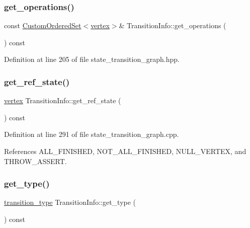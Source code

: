 \subsubsection{\texorpdfstring{get\+\_\+operations()}{get\_operations()}}
{\footnotesize\ttfamily const \hyperlink{classCustomOrderedSet}{Custom\+Ordered\+Set}$<$\hyperlink{graph_8hpp_abefdcf0544e601805af44eca032cca14}{vertex}$>$\& Transition\+Info\+::get\+\_\+operations (\begin{DoxyParamCaption}{ }\end{DoxyParamCaption}) const\hspace{0.3cm}{\ttfamily [inline]}}



Definition at line 205 of file state\+\_\+transition\+\_\+graph.\+hpp.

\mbox{\label{classTransitionInfo_a15343bac3bce680f7e614490e7340c87}} 
\subsubsection{\texorpdfstring{get\+\_\+ref\+\_\+state()}{get\_ref\_state()}}
{\footnotesize\ttfamily \hyperlink{graph_8hpp_abefdcf0544e601805af44eca032cca14}{vertex} Transition\+Info\+::get\+\_\+ref\+\_\+state (\begin{DoxyParamCaption}{ }\end{DoxyParamCaption}) const}



Definition at line 291 of file state\+\_\+transition\+\_\+graph.\+cpp.



References A\+L\+L\+\_\+\+F\+I\+N\+I\+S\+H\+ED, N\+O\+T\+\_\+\+A\+L\+L\+\_\+\+F\+I\+N\+I\+S\+H\+ED, N\+U\+L\+L\+\_\+\+V\+E\+R\+T\+EX, and T\+H\+R\+O\+W\+\_\+\+A\+S\+S\+E\+RT.

\mbox{\label{classTransitionInfo_a803fb774294b2e87d448903333c1cae1}} 
\subsubsection{\texorpdfstring{get\+\_\+type()}{get\_type()}}
{\footnotesize\ttfamily \hyperlink{state__transition__graph_8hpp_a73ce4c522d9c8d45a7e1ab48c95a1710}{transition\+\_\+type} Transition\+Info\+::get\+\_\+type (\begin{DoxyParamCaption}{ }\end{DoxyParamCaption}) const\hspace{0.3cm}{\ttfamily [inline]}}



